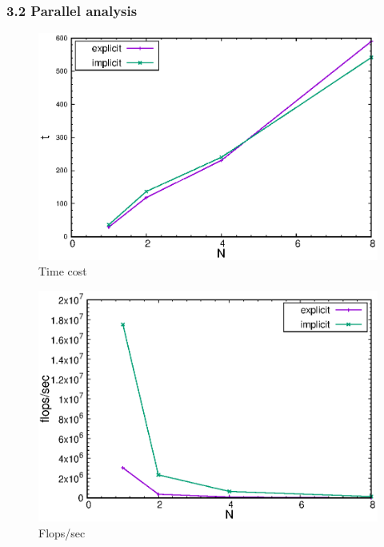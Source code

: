 \documentclass[12pt]{article}
\begin{document}
\subsubsection*{3.2 Parallel analysis}

\begin{figure}
    \centering
    \includegraphics{../plot/time.eps}
    \caption{Time cost}
    \label{fig:time}
\end{figure}

\begin{figure}
    \centering
    \includegraphics{../plot/flops.eps}
    \caption{Flops/sec}
    \label{fig:flops}
\end{figure}
\end{document}

